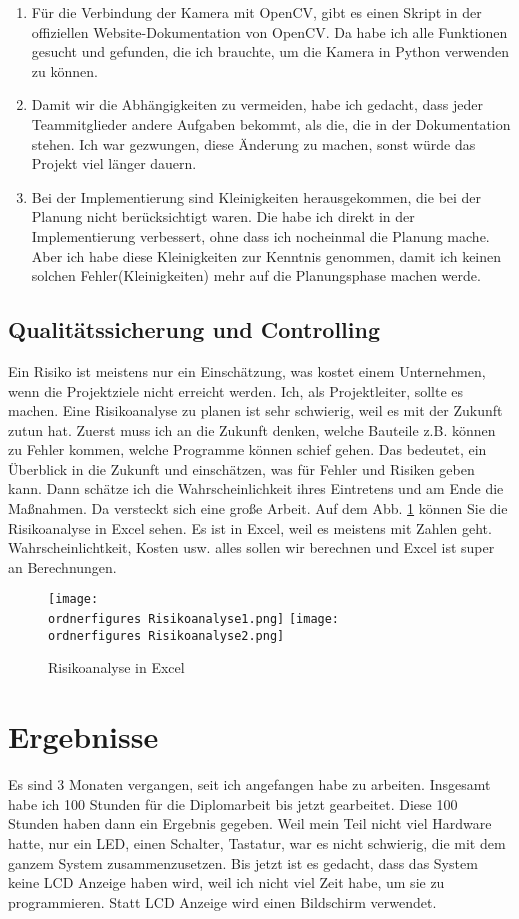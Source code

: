 \begin{itemize}
\begin{enumerate}
	\item  Für die Verbindung der Kamera mit OpenCV, gibt es einen Skript in der offiziellen Website-Dokumentation von OpenCV. Da habe ich alle Funktionen gesucht und gefunden, die ich brauchte, um die Kamera in Python verwenden zu können. 
	
	\item Damit wir die Abhängigkeiten zu vermeiden, habe ich gedacht, dass jeder Teammitglieder andere Aufgaben bekommt, als die, die in der Dokumentation stehen. Ich war gezwungen, diese Änderung zu machen, sonst würde das Projekt viel länger dauern. 
	
	\item Bei der Implementierung sind Kleinigkeiten herausgekommen, die bei der Planung nicht berücksichtigt waren. Die habe ich direkt in der Implementierung verbessert, ohne dass ich nocheinmal die Planung mache. Aber ich habe diese Kleinigkeiten zur Kenntnis genommen, damit ich keinen solchen Fehler(Kleinigkeiten) mehr auf die Planungsphase machen werde. 
 \end{enumerate}
\end{itemize}
\subsection{Qualitätssicherung und Controlling}
Ein Risiko ist meistens nur ein Einschätzung, was kostet einem Unternehmen, wenn die Projektziele nicht erreicht werden. Ich, als Projektleiter, sollte es machen. Eine Risikoanalyse zu planen ist sehr schwierig, weil es mit der Zukunft zutun hat. Zuerst muss ich an die Zukunft denken, welche Bauteile z.B. können zu Fehler kommen, welche Programme können schief gehen. Das bedeutet, ein Überblick in die Zukunft und einschätzen, was für Fehler und Risiken geben kann. Dann schätze ich die Wahrscheinlichkeit ihres Eintretens und am Ende die Maßnahmen. Da versteckt sich eine große Arbeit.\cite{Risikoanalyse} 
Auf dem Abb. \ref{fig:Risikoanalyse} können Sie die Risikoanalyse in Excel sehen. Es ist in Excel, weil es meistens mit Zahlen geht. Wahrscheinlichtkeit, Kosten usw. alles sollen wir berechnen und Excel ist super an Berechnungen.
\begin{figure}[H]
	\texttt{[image: \\ordnerfigures Risikoanalyse1.png]}
	\texttt{[image: \\ordnerfigures Risikoanalyse2.png]}
	\caption{Risikoanalyse in Excel}
	\label{fig:Risikoanalyse}
\end{figure}

\section{Ergebnisse}
Es sind 3 Monaten vergangen, seit ich angefangen habe zu arbeiten. Insgesamt habe ich 100 Stunden für die Diplomarbeit bis jetzt gearbeitet. Diese 100 Stunden haben dann ein Ergebnis gegeben. Weil mein Teil nicht viel Hardware hatte, nur ein LED, einen Schalter, Tastatur, war es nicht schwierig, die mit dem ganzem System zusammenzusetzen. Bis jetzt ist es gedacht, dass das System keine LCD Anzeige haben wird, weil ich nicht viel Zeit habe, um sie zu programmieren. Statt LCD Anzeige wird einen Bildschirm verwendet. 
